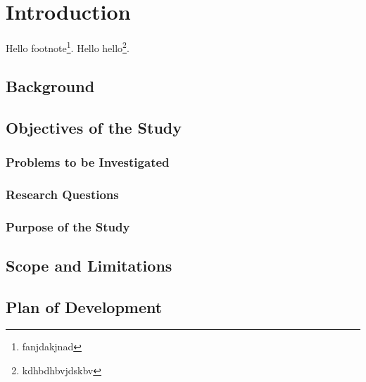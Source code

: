 \chapter{Introduction}
\lipsum
Hello footnote\footnote{fanjdakjnad}.
Hello hello\footnote{kdhbdhbvjdskbv}.\cite{control}

\section{Background}
\section{Objectives of the Study}
\subsection{Problems to be Investigated}
\subsection{Research Questions}
\subsection{Purpose of the Study}
\section{Scope and Limitations}
\section{Plan of Development}